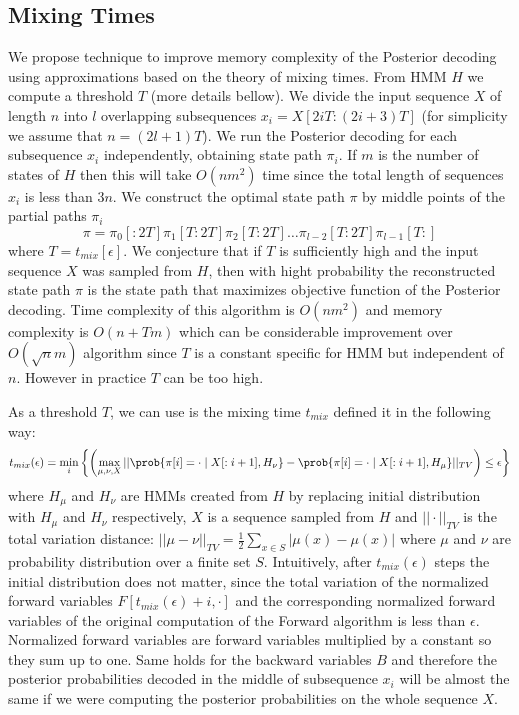\subsection{Mixing Times}

\def\tmix{t_{mix}(\epsilon)}
We propose technique to improve memory complexity of the
Posterior decoding using approximations based on the theory of mixing times.
From HMM $H$ we compute a threshold  $T$ (more details
bellow).  We divide the input sequence $X$ of length $n$ into $l$ overlapping
subsequences $x_i=X[2iT:(2i+3)T]$ (for simplicity we assume that $n=(2l+1)T$).  
We run the Posterior decoding for each subsequence $x_i$ independently, obtaining state path
$\pi_i$. If $m$ is the number of states of $H$
then this will take $O(nm^2)$ time since the total length of sequences $x_i$ is
less than $3n$.  We construct the optimal state path $\pi$ by middle points of
the partial paths $\pi_i$
\[\pi = \pi_0[:2T]
\pi_1[T:2T] \pi_2[T:2T] \dots \pi_{l-2}[T:2T] \pi_{l-1}[T:]\] where
$T=t_{mix}[\epsilon]$.
We conjecture that if $T$ is sufficiently high and the input
sequence $X$ was sampled from $H$, then with hight probability the reconstructed
state path $\pi$ is the state path that maximizes objective function of the
Posterior decoding.  Time complexity of this algorithm is $O(nm^2)$ and memory
complexity is $O(n+Tm)$ which can be considerable improvement over $O(\sqrt n
m)$ algorithm since $T$ is a constant specific for HMM but independent of $n$. However in practice $T$
can be too high.

As a threshold $T$, we can use is the mixing time $t_{mix}$ defined it in the following way:
\[\tmix = \min_{i}\left\{ 
\left(\max_{\mu,\nu,X} || \prob{\pi[i] = \cdot\mid X[:i+1],H_\nu} - \prob{\pi[i] = \cdot\mid
X[:i+1],H_\mu}||_{TV}\right)\leq \epsilon
\right\}
\] 
where $H_\mu$ and $H_\nu$ are HMMs created from $H$ by replacing initial
distribution with $H_\mu$ and $H_\nu$ respectively,
$X$ is a sequence
sampled from $H$ and $||\cdot||_{TV}$ is the total variation distance:
$||\mu-\nu||_{TV}=\frac12\sum_{x\in S}|\mu(x)-\mu(x)|$ where $\mu$ and $\nu$
are probability distribution over a finite set $S$.
Intuitively, after $\tmix$ steps the initial distribution does not matter, since
the total variation of the normalized forward variables $F[\tmix+i,\cdot]$
and the corresponding normalized forward variables of the original computation
of the Forward algorithm is less than $\epsilon$. Normalized forward variables
are forward variables multiplied by a constant so they sum up to one. 
Same holds for the backward variables $B$ and therefore the posterior
probabilities decoded in the middle of subsequence $x_i$ will be almost the same
if we were computing the posterior probabilities on the whole sequence $X$.

